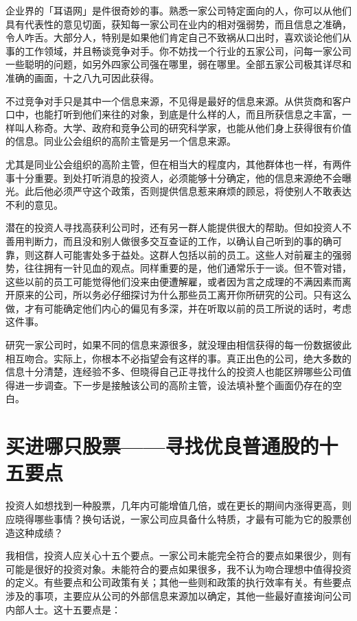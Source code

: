 \documentclass[UTF8,a4paper,zihao=-4,fontset = windows]{ctexart} %
\begin{document}
企业界的「耳语网」是件很奇妙的事。熟悉一家公司特定面向的人，你可以从他们具有代表性的意见切面，获知每一家公司在业内的相对强弱势，而且信息之准确，令人咋舌。大部分人，特别是如果他们肯定自己不致祸从口出时，喜欢谈论他们从事的工作领域，并且畅谈竞争对手。你不妨找一个行业的五家公司，问每一家公司一些聪明的问题，如另外四家公司强在哪里，弱在哪里。全部五家公司极其详尽和准确的画面，十之八九可因此获得。

不过竞争对手只是其中一个信息来源，不见得是最好的信息来源。从供货商和客户口中，也能打听到他们来往的对象，到底是什么样的人，而且所获信息之丰富，一样叫人称奇。大学、政府和竞争公司的研究科学家，也能从他们身上获得很有价值的信息。同业公会组织的高阶主管是另一个信息来源。

尤其是同业公会组织的高阶主管，但在相当大的程度内，其他群体也一样，有两件事十分重要。到处打听消息的投资人，必须能够十分确定，他的信息来源绝不会曝光。此后他必须严守这个政策，否则提供信息惹来麻烦的顾忌，将使别人不敢表达不利的意见。

潜在的投资人寻找高获利公司时，还有另一群人能提供很大的帮助。但如投资人不善用判断力，而且没和别人做很多交互查证的工作，以确认自己听到的事的确可靠，则这群人可能害处多于益处。这群人包括以前的员工。这些人对前雇主的强弱势，往往拥有一针见血的观点。同样重要的是，他们通常乐于一谈。但不管对错，这些以前的员工可能觉得他们没来由便遭解雇，或者因为言之成理的不满因素而离开原来的公司，所以务必仔细探讨为什么那些员工离开你所研究的公司。只有这么做，才有可能确定他们内心的偏见有多深，并在听取以前的员工所说的话时，考虑这件事。

研究一家公司时，如果不同的信息来源很多，就没理由相信获得的每一份数据彼此相互吻合。实际上，你根本不必指望会有这样的事。真正出色的公司，绝大多数的信息十分清楚，连经验不多、但晓得自己正寻找什么的投资人也能区辨哪些公司值得进一步调查。下一步是接触该公司的高阶主管，设法填补整个画面仍存在的空白。

\section{买进哪只股票——寻找优良普通股的十五要点}

投资人如想找到一种股票，几年内可能增值几倍，或在更长的期间内涨得更高，则应晓得哪些事情？换句话说，一家公司应具备什么特质，才最有可能为它的股票创造这种成绩？

我相信，投资人应关心十五个要点。一家公司未能完全符合的要点如果很少，则有可能是很好的投资对象。未能符合的要点如果很多，我不认为吻合理想中值得投资的定义。有些要点和公司政策有关；其他一些则和政策的执行效率有关。有些要点涉及的事项，主要应从公司的外部信息来源加以确定，其他一些最好直接询问公司内部人士。这十五要点是：
\\
\end{document}
